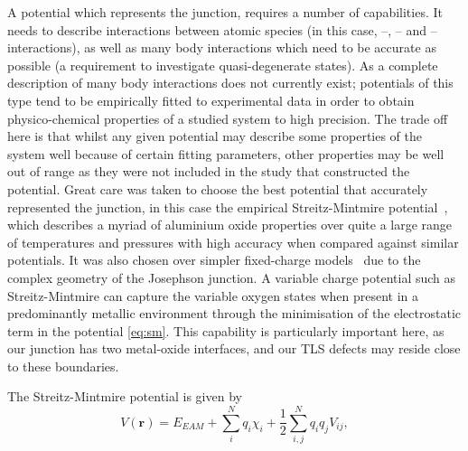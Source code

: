 A potential which represents the junction, requires a number of capabilities.
It needs to describe interactions between atomic species (in this case, --, -- and -- interactions), as well as many body interactions which need to be accurate as possible (a requirement to investigate quasi-degenerate states).
As a complete description of many body interactions does not currently exist; potentials of this type tend to be empirically fitted to experimental data in order to obtain physico-chemical properties of a studied system to high precision.
The trade off here is that whilst any given potential may describe some properties of the system well because of certain fitting parameters, other properties may be well out of range as they were not included in the study that constructed the potential.
Great care was taken to choose the best potential that accurately represented the junction, in this case the empirical Streitz-Mintmire potential~\cite{Streitz1994}, which describes a myriad of aluminium oxide properties over quite a large range of temperatures and pressures with high accuracy when compared against similar potentials.
It was also chosen over simpler fixed-charge models~\cite{Catlow1982,Dienes1975} due to the complex geometry of the Josephson junction. A variable charge potential such as Streitz-Mintmire can capture the variable oxygen states when present in a predominantly metallic environment through the minimisation of the electrostatic term in the potential \cref{eq:sm}.
This capability is particularly important here, as our junction has two metal-oxide interfaces, and our TLS defects may reside close to these boundaries.

The Streitz-Mintmire potential is given by
\begin{equation}
V(\mathbf{r}) = E_{EAM}+\sum_{i}^{N}q_i\chi_i + \frac{1}{2}\sum_{i,j}^{N}q_{i}q_{j}V_{ij},\label{eq:sm}
\end{equation}

